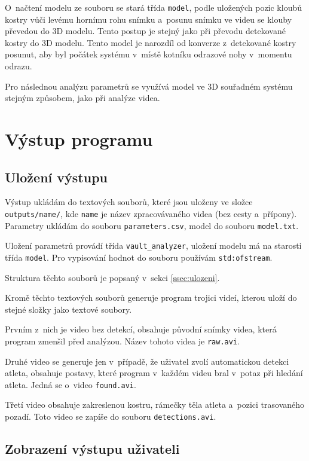 O~načtení modelu ze souboru se stará třída \texttt{model}, podle uložených pozic kloubů kostry vůči levému hornímu rohu snímku a~posunu snímku ve videu se klouby převedou do 3D modelu. Tento postup je stejný jako při převodu detekované kostry do 3D modelu. Tento model je narozdíl od konverze z~detekované kostry posunut, aby byl počátek systému v~místě kotníku odrazové nohy v~momentu odrazu.

Pro následnou analýzu parametrů se využívá model ve 3D souřadném systému stejným způsobem, jako při analýze videa.



\section{Výstup programu}

\subsection{Uložení výstupu}

Výstup ukládám do textových souborů, které jsou uloženy ve složce \texttt{outputs/\allowbreak name/}, kde \texttt{name} je název zpracovávaného videa (bez cesty a~přípony). Parametry ukládám do souboru \texttt{parameters.csv}, model do souboru \texttt{model.txt}.

Uložení parametrů provádí třída \texttt{vault\_analyzer}, uložení modelu má na starosti třída \texttt{model}. Pro vypisování hodnot do souboru používám \texttt{std\::ofstream}.

Struktura těchto souborů je popsaný v~sekci \ref{ssec:ulozeni}.

Kromě těchto textových souborů generuje program trojici videí, kterou uloží do stejné složky jako textové soubory.

Prvním z~nich je video bez detekcí, obsahuje původní snímky videa, která program zmenšil před analýzou. Název tohoto videa je \texttt{raw.avi}.

Druhé video se generuje jen v~případě, že uživatel zvolí automatickou detekci atleta, obsahuje postavy, které program v~každém videu bral v~potaz při hledání atleta. Jedná se o~video \texttt{found.avi}.

Třetí video obsahuje zakreslenou kostru, rámečky těla atleta a~pozici trasovaného pozadí. Toto video se zapíše do souboru \texttt{detections.avi}.



\subsection{Zobrazení výstupu uživateli}

